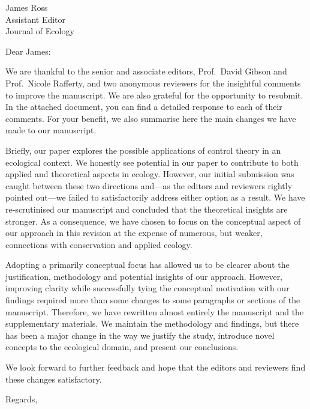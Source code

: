 \documentclass{letter}
\begin{document}
\begin{letter}{James Ross \\ Assistant Editor \\ Journal of Ecology}
\opening{Dear James:}

\onehalfspacing

We are thankful to the senior and associate editors, Prof.\ David Gibson and Prof.\ Nicole Rafferty, and two anonymous reviewers for the insightful comments to improve the manuscript. 
We are also grateful for the opportunity to resubmit. 
In the attached document, you can find a detailed response to each of their comments. 
For your benefit, we also summarise here the main changes we have made to our manuscript. 

Briefly, our paper explores the possible applications of control theory in an ecological context. 
We honestly see potential in our paper to contribute to both applied and theoretical aspects in ecology. 
However, our initial submission was caught between these two directions and---as the editors and reviewers rightly pointed out---we failed to satisfactorily address either option as a result.
We have re-scrutinised our manuscript and concluded that the theoretical insights are stronger. 
As a consequence, we have chosen to focus on the conceptual aspect of our approach in this revision at the expense of numerous, but weaker, connections with conservation and applied ecology.

Adopting a primarily conceptual focus has allowed us to be clearer about the justification, methodology and potential insights of our approach. 
However, improving clarity while successfully tying the conceptual motivation with our findings required more than some changes to some paragraphs or sections of the manuscript. 
Therefore, we have rewritten almost entirely the manuscript and the supplementary materials. 
We maintain the methodology and findings, but there has been a major change in the way we justify the study, introduce novel concepts to the ecological domain, and present our conclusions. 

We look forward to further feedback and hope that the editors and reviewers find these changes satisfactory.

\closing{Regards,}
\end{letter}
\end{document}
